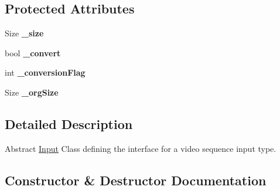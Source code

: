 \subsection*{Protected Attributes}
\begin{DoxyCompactItemize}
\item 
Size {\bfseries \+\_\+size}\hypertarget{classviva_1_1_input_a987798abae2d1a624452bc78e1bfc697}{}\label{classviva_1_1_input_a987798abae2d1a624452bc78e1bfc697}

\item 
bool {\bfseries \+\_\+convert}\hypertarget{classviva_1_1_input_a70d7f2d92f128ee2381edb7acd39266f}{}\label{classviva_1_1_input_a70d7f2d92f128ee2381edb7acd39266f}

\item 
int {\bfseries \+\_\+conversion\+Flag}\hypertarget{classviva_1_1_input_ab86c4dc7244fc837b26fe53dd07b4a9b}{}\label{classviva_1_1_input_ab86c4dc7244fc837b26fe53dd07b4a9b}

\item 
Size {\bfseries \+\_\+org\+Size}\hypertarget{classviva_1_1_input_ad70fb7270e0c587f2376b1a7ec9c35fc}{}\label{classviva_1_1_input_ad70fb7270e0c587f2376b1a7ec9c35fc}

\end{DoxyCompactItemize}


\subsection{Detailed Description}
Abstract \hyperlink{classviva_1_1_input}{Input} Class defining the interface for a video sequence input type. 

\subsection{Constructor \& Destructor Documentation}
